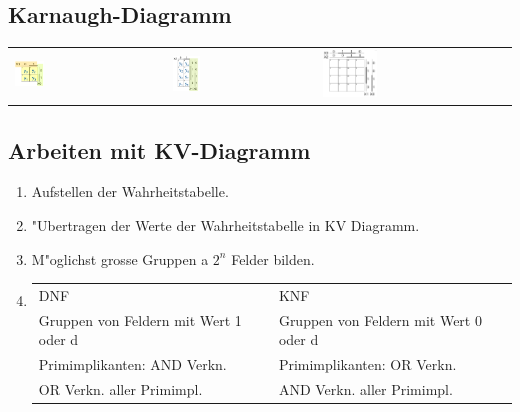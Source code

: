 \subsection{Karnaugh-Diagramm}
\begin{tabular}{lll}
	\includegraphics[width=0.2\textwidth]{pics/kv/2erKV} & 
	\includegraphics[width=0.2\textwidth]{pics/kv/3erKV} &
	\includegraphics[width=0.3\textwidth]{pics/kv/4erKV}\\
\end{tabular}
\subsection{Arbeiten mit KV-Diagramm}
\begin{enumerate}
\setlength{\itemsep}{1pt}
  \setlength{\parskip}{0pt}
  \setlength{\parsep}{0pt}
\item Aufstellen der Wahrheitstabelle.\\
\item "Ubertragen der Werte der Wahrheitstabelle in KV Diagramm.\\
\item M"oglichst grosse Gruppen a $2^n$ Felder bilden.\\
\item
\begin{tabular}{ll}
	DNF & KNF \\
	Gruppen von Feldern mit Wert 1 oder d & Gruppen von Feldern mit Wert 0 oder d\\
	Primimplikanten: AND Verkn. & Primimplikanten: OR Verkn.\\
	OR Verkn. aller Primimpl. & AND Verkn. aller Primimpl.\\
\end{tabular}
\end{enumerate}